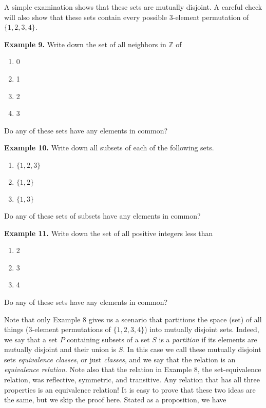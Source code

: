 \documentclass[12pt, letterpaper]{article}
\theoremstyle{definition}
\begin{document}
\noindent A simple examination shows that these sets are mutually disjoint.
A careful check will also show that these sets contain every possible
3-element permutation of $\{ 1, 2, 3, 4 \}$.

\vspace*{0.2in}\noindent
\textbf{Example 9.}
Write down the set of all neighbors in $\mathbb{Z}$ of
\begin{multicols}{4}
    \begin{enumerate}[label=\textbf{\alph*.}]
        \item 0
        \item 1
        \item 2
        \item 3
    \end{enumerate}
\end{multicols}
Do any of these sets have any elements in common?

\vspace*{0.2in}\noindent
\textbf{Example 10.}
Write down all subsets of each of the following sets.
\begin{multicols}{3}
    \begin{enumerate}[label=\textbf{\alph*.}]
        \item $\{ 1, 2, 3 \}$
        \item $\{ 1, 2 \}$
        \item $\{ 1, 3 \}$
    \end{enumerate}
\end{multicols}
Do any of these sets of subsets have any elements in common?

\clearpage\pagebreak\noindent
\textbf{Example 11.}
Write down the set of all positive integers less than
\begin{multicols}{3}
    \begin{enumerate}[label=\textbf{\alph*.}]
        \item 2
        \item 3
        \item 4
    \end{enumerate}
\end{multicols}
Do any of these sets have any elements in common?

\vspace*{0.3in}
Note that only Example 8 gives us a scenario that partitions the space (set) of
all things (3-element permutations of $\{ 1, 2, 3, 4 \}$) into mutually disjoint
sets. Indeed, we say that a set $P$ containing subsets of a set $S$ is a
\emph{partition} if its elements are mutually disjoint and their union is $S$.
In this case we call these mutually disjoint sets \emph{equivalence classes},
or just \emph{classes}, and we say that the relation is an
\emph{equivalence relation}. Note also that the relation in Example 8, the
set-equivalence relation, was reflective, symmetric, and transitive. Any
relation that has all three properties is an equivalence relation! It is easy to
prove that these two ideas are the same, but we skip the proof here. Stated as a
proposition, we have
\end{document}
